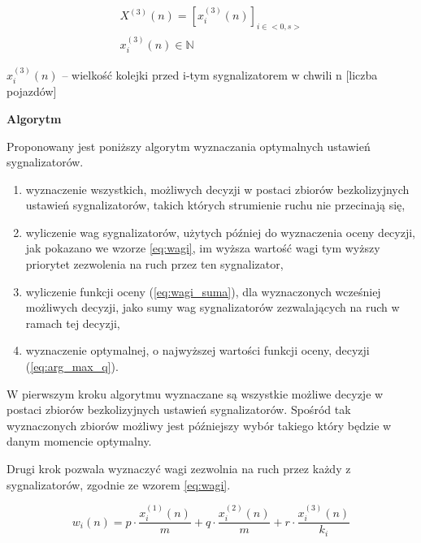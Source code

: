 \begin{equation}
	\begin{array}{c}
		X^{(3)} (n) = \left[ x^{(3)}_{i} (n) \right]_{i \in <0,s>}\\
		x^{(3)}_{i} (n) \in \mathbb{N}
	\end{array}
\end{equation}

\begin{math} x^{(3)}_{i} (n) \end{math} \textrm{ -- wielkość kolejki przed i-tym sygnalizatorem w chwili n [liczba pojazdów]}

\vspace{1.5cm}
\textbf{Algorytm}

Proponowany jest poniższy algorytm wyznaczania optymalnych ustawień sygnalizatorów.
\begin{enumerate}
	\item wyznaczenie wszystkich, możliwych decyzji w postaci zbiorów bezkolizyjnych ustawień sygnalizatorów, takich których strumienie ruchu nie przecinają się,
	\item wyliczenie wag sygnalizatorów, użytych później do wyznaczenia oceny decyzji, jak pokazano we wzorze \ref{eq:wagi}, im wyższa wartość wagi tym wyższy priorytet zezwolenia na ruch przez ten sygnalizator,
	\item wyliczenie funkcji oceny (\ref{eq:wagi_suma}), dla wyznaczonych wcześniej możliwych decyzji, jako sumy wag sygnalizatorów zezwalających na ruch w ramach tej decyzji,
	\item wyznaczenie optymalnej, o najwyższej wartości funkcji oceny, decyzji (\ref{eq:arg_max_q}).
\end{enumerate}

\vspace{0.5cm}
W pierwszym kroku algorytmu wyznaczane są wszystkie możliwe decyzje w postaci zbiorów bezkolizyjnych ustawień sygnalizatorów.
Spośród tak wyznaczonych zbiorów możliwy jest późniejszy wybór takiego który będzie w danym momencie optymalny.

\vspace{0.5cm}
Drugi krok pozwala wyznaczyć wagi zezwolnia na ruch przez każdy z sygnalizatorów, zgodnie ze wzorem \ref{eq:wagi}.

\begin{equation}
\label{eq:wagi}
	w_{i} (n) = p \cdot \frac{x^{(1)}_{i} (n)}{m} + q \cdot \frac{x^{(2)}_{i} (n)}{m} + r \cdot \frac{x^{(3)}_{i} (n)}{k_{i}}
\end{equation}

